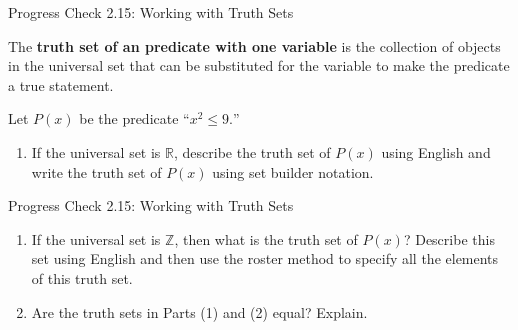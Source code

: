 \documentclass{beamer}
\begin{document}
\begin{frame}{Progress Check 2.15: Working with Truth Sets}
	\begin{definition}
		The \textbf{truth set of an predicate with one variable} is the
		collection of objects in the universal set that can be substituted for the variable
		to make the predicate a true statement.
	\end{definition}

	\pause
	
	Let $P(x)$ be the predicate “$x^2 \leq 9.$”
	\begin{enumerate}
	\item If the universal set is $\mathbb{R}$, describe the truth set of $P(x)$ using English and
	write the truth set of $P(x)$ using set builder notation.
	\vspace{1.5 in}
	\end{enumerate}
\end{frame}

\begin{frame}{Progress Check 2.15: Working with Truth Sets}
	\begin{enumerate}
		\item[2.] If the universal set is $\mathbb{Z}$, then what is the truth set of $P(x)$? Describe this set using English and then use the roster method to specify all the elements of
		this truth set.\\[1 in]\pause
		\item[3.] Are the truth sets in Parts (1) and (2) equal? Explain.\\[1 in]
	\end{enumerate}
\end{frame}
\end{document}

